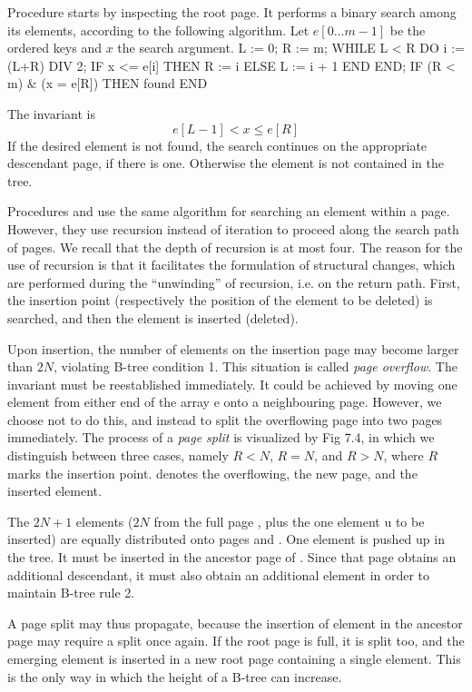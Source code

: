 
Procedure  starts by inspecting the root page. It performs a binary search among its elements, according to the following algorithm. Let $e[0 ... m-1]$ be the ordered keys and $x$ the search argument.
\begintt
L := 0; R := m;
WHILE L < R DO
  i := (L+R) DIV 2;
  IF x <= e[i] THEN R := i ELSE L := i + 1 END
END;
IF (R < m) & (x = e[R]) THEN found END
\endtt

\noindent The invariant is
$$e[L-1] < x \le e[R]$$
If the desired element is not found, the search continues on the appropriate descendant page, if there is one. Otherwise the element is not contained in the tree.

Procedures  and  use the same algorithm for searching an element within a page. However, they use recursion instead of iteration to proceed along the search path of pages. We recall that the depth of recursion is at most four. The reason for the use of recursion is that it facilitates the formulation of structural changes, which are performed during the ``unwinding'' of recursion, i.e. on the return path. First, the insertion point (respectively the position of the element to be deleted) is searched, and then the element is inserted (deleted).

Upon insertion, the number of elements on the insertion page may become larger than $2N$, violating B-tree condition 1. This situation is called \emph{page overflow}. The invariant must be reestablished immediately. It could be achieved by moving one element from either end of the array e onto a neighbouring page. However, we choose not to do this, and instead to split the overflowing page into two pages immediately. The process of a \emph{page split} is visualized by Fig 7.4, in which we distinguish between three cases, namely $R < N$, $R = N$, and $R > N$, where $R$ marks the insertion point.  denotes the overflowing,  the new page, and  the inserted element.

The $2N + 1$ elements ($2N$ from the full page , plus the one element u to be inserted) are equally distributed onto pages  and . One element  is pushed up in the tree. It must be inserted in the ancestor page of . Since that page obtains an additional descendant, it must also obtain an additional element in order to maintain B-tree rule 2.

A page split may thus propagate, because the insertion of element  in the ancestor page may require a split once again. If the root page is full, it is split too, and the emerging element  is inserted in a new root page containing a single element. This is the only way in which the height of a B-tree can increase.


